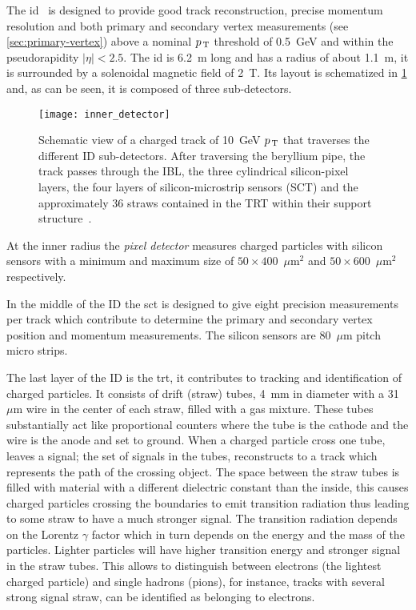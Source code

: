 The \gls{id}~\cite{ATLASPaper} is designed to provide good track reconstruction,
precise momentum resolution and both primary and secondary vertex measurements
(see \cref{sec:primary-vertex}) above a nominal $p_\mathrm{\, T}$ threshold of 0.5~GeV and
within the pseudorapidity $|\eta| < 2.5$. The \gls{id} is 6.2~m long and has a
radius of about 1.1~m, it is surrounded by a solenoidal magnetic field of
2~T. Its layout is schematized in \cref{fig:id} and, as can be seen, it is
composed of three sub-detectors.
\begin{figure}[!hb]
  \centering
    \texttt{[image: inner\_detector]}
    \caption{Schematic view of a charged track of 10~GeV $p_\mathrm{\, T}$ that traverses
      the different ID sub-detectors. After traversing the beryllium pipe, the
      track passes through the IBL, the three cylindrical silicon-pixel layers,
      the four layers of silicon-microstrip sensors (SCT) and the approximately
      36 straws contained in the TRT within their support
      structure~\cite{InnerDetectorPlotIBL}.}
    \label{fig:id}
\end{figure}

At the inner radius the \emph{pixel detector} measures charged particles with
silicon sensors with a minimum and maximum size of $50 \times 400$~$\mu$m$^2$
and $50 \times 600$~$\mu$m$^2$ respectively.

In the middle of the ID the \gls{sct} is designed to give eight precision
measurements per track which contribute to determine the primary and secondary
vertex position and momentum measurements. The silicon sensors are 80~$\mu$m
pitch micro strips.

The last layer of the ID is the \gls{trt}, it contributes to tracking and
identification of charged particles. It consists of drift (straw) tubes, 4~mm in
diameter with a 31~$\mu$m wire in the center of each straw, filled with a gas
mixture. These tubes substantially act like proportional counters where the tube
is the cathode and the wire is the anode and set to ground. When a charged
particle cross one tube, leaves a signal; the set of signals in the tubes,
reconstructs to a track which represents the path of the crossing object. The
space between the straw tubes is filled with material with a different
dielectric constant than the inside, this causes charged particles crossing the
boundaries to emit transition radiation thus leading to some straw to have a
much stronger signal. The transition radiation depends on the Lorentz $\gamma$
factor which in turn depends on the energy and the mass of the particles.
Lighter particles will have higher transition energy and stronger signal in the
straw tubes. This allows to distinguish between electrons (the lightest charged
particle) and single hadrons (pions), for instance, tracks with several strong
signal straw, can be identified as belonging to electrons.

